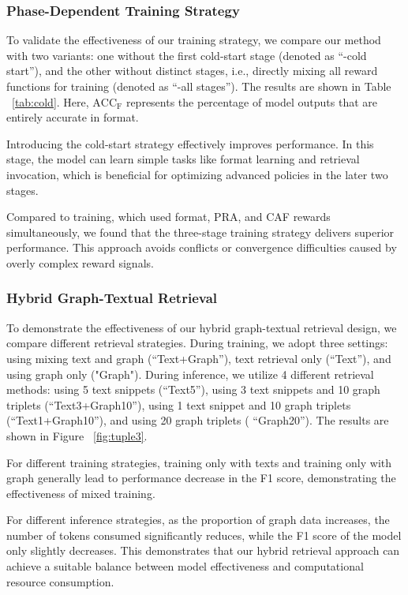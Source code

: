 \subsubsection{Phase-Dependent Training Strategy}
To validate the effectiveness of our training strategy, we compare our method with two variants: one without the first cold-start stage (denoted as ``-cold start''), and the other without distinct stages, i.e., directly mixing all reward functions for training (denoted as ``-all stages''). The results are shown in Table ~\ref{tab:cold}. Here, $\mathrm{ACC_{F}}$ represents the percentage of model outputs that are entirely accurate in format. %

Introducing the cold-start strategy effectively improves performance. %
In this stage, the model can learn simple tasks like format learning and retrieval invocation, which is beneficial for optimizing advanced policies in the later two stages. 

Compared to training, which used format, PRA, and CAF rewards simultaneously, we found that the three-stage training strategy delivers superior performance. 
This approach avoids conflicts or convergence difficulties caused by overly complex reward signals.


\subsubsection{Hybrid Graph-Textual Retrieval}\label{sec:exp:hybrid}
To demonstrate the effectiveness of our hybrid graph-textual retrieval design, we compare different retrieval strategies. During training, we adopt three settings: using mixing text and graph (``Text+Graph''), text retrieval only (``Text''), and using graph only ("Graph"). During inference, we utilize 4 different retrieval methods: using 5 text snippets (``Text5''), using 3 text snippets and 10 graph triplets (``Text3+Graph10''), using 1 text snippet and 10 graph triplets (``Text1+Graph10''), and using 20 graph triplets ( ``Graph20''). 
The results are shown in Figure ~\ref{fig:tuple3}.


For different training strategies, training only with texts and training only with graph generally lead to performance decrease in the F1 score, demonstrating the effectiveness of mixed training.

For different inference strategies, as the proportion of graph data increases, the number of tokens consumed significantly reduces, while the F1 score of the model only slightly decreases. 
This demonstrates that our hybrid retrieval approach can achieve a suitable balance between model effectiveness and computational resource consumption.  %



